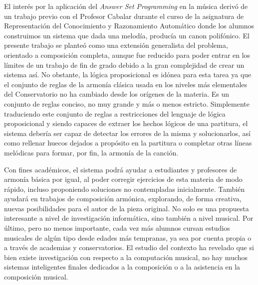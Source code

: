 El interés por la aplicación del \textit{Answer Set Programming} en la música derivó de un trabajo previo con el Profesor Cabalar durante el curso de la asignatura de Representación del Conocimiento y Razonamiento Automático donde los alumnos construimos un sistema que dada una melodía, producía un canon polifónico. El presente trabajo se planteó como una extensión generalista del problema, orientado a composición completa, aunque fue reducido para poder entrar en los límites de un trabajo de fin de grado debido a la gran complejidad de crear un sistema así. No obstante, la lógica proposicional es idónea para esta tarea ya que el conjunto de reglas de la armonía clásica usada en los niveles más elementales del Conservatorio no ha cambiado desde los orígenes de la materia. Es un conjunto de reglas conciso, no muy grande y más o menos estricto. Simplemente traduciendo este conjunto de reglas a restricciones del lenguaje de lógica proposicional y siendo capaces de extraer los hechos lógicos de una partitura, el sistema debería ser capaz de detectar los errores de la misma y solucionarlos, así como rellenar huecos dejados a propósito en la partitura o completar otras líneas melódicas para formar, por fin, la armonía de la canción.

Con fines académicos, el sistema podrá ayudar a estudiantes y profesores de armonía básica por igual, al poder corregir ejercicios de esta materia de modo rápido, incluso proponiendo soluciones no contempladas inicialmente. También ayudará en trabajos de composición armónica, explorando, de forma creativa, nuevas posibilidades para el autor de la pieza original. No solo es una propuesta interesante a nivel de investigación informática, sino también a nivel musical. Por último, pero no menos importante, cada vez más alumnos cursan estudios musicales de algún tipo desde edades más tempranas, ya sea por cuenta propia o a través de academias y conservatorios. El estudio del contexto ha revelado que si bien existe investigación con respecto a la computación musical, no hay muchos sistemas inteligentes finales dedicados a la composición o a la asistencia en la composición musical.
